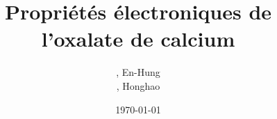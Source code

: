 \title{Propriétés électroniques de l'oxalate de calcium}
\author{, En-Hung \\ , Honghao}
\date{\today}
